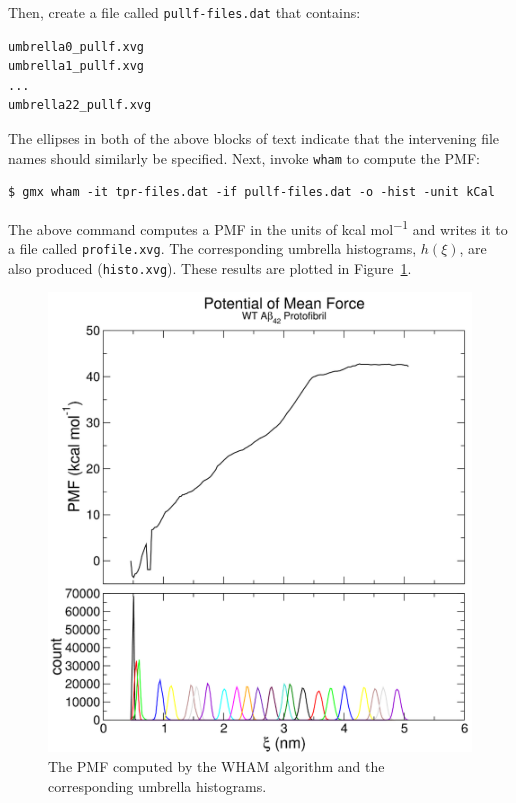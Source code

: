 \documentclass[9pt,tutorial,pubversion]{livecoms}
\begin{document}
Then, create a file called \texttt{pullf-files.dat} that contains:

\begin{lstlisting}
umbrella0_pullf.xvg
umbrella1_pullf.xvg
...
umbrella22_pullf.xvg
\end{lstlisting}

The ellipses in both of the above blocks of text indicate that the intervening file names should similarly be specified. Next, invoke \texttt{wham} to compute the PMF:

\begin{lstlisting}
$ gmx wham -it tpr-files.dat -if pullf-files.dat -o -hist -unit kCal
\end{lstlisting}

The above command computes a PMF in the units of kcal mol\textsuperscript{$-$1} and writes it to a file called \texttt{profile.xvg}. The corresponding umbrella histograms, $h(\xi)$, are also produced (\texttt{histo.xvg}). These results are plotted in Figure~\ref{umbrella_composite_pmf_histo_fig}.

\begin{figure}[h!]
\centering
\includegraphics{umbrella_composite_pmf_histo}
\caption{The PMF computed by the WHAM algorithm and the corresponding umbrella histograms.}
\label{umbrella_composite_pmf_histo_fig}
\end{figure}
\end{document}
